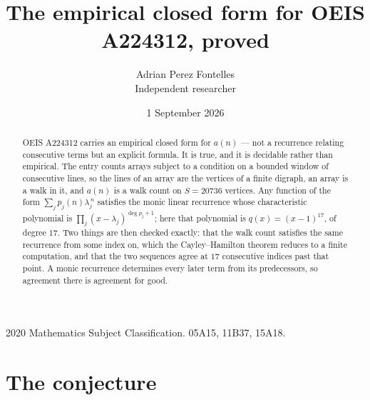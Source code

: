 \documentclass[11pt,a4paper]{article}
\title{The empirical closed form for OEIS A224312, proved}
\author{Adrian Perez Fontelles\\ \small Independent researcher}
\date{1 September 2026}
\theoremstyle{plain}
\theoremstyle{definition}
\begin{document}
\maketitle

\begin{abstract}
OEIS A224312 carries an empirical closed form for $a(n)$ --- not a recurrence relating
consecutive terms but an explicit formula. It is true, and it is decidable rather than
empirical. The entry counts arrays subject to a condition on a bounded window of consecutive lines, so the lines of an array are the
vertices of a finite digraph, an array is a walk in it, and $a(n)$ is a walk count on
$S=20736$ vertices. Any function of the form $\sum_j p_j(n)\lambda_j^{\,n}$ satisfies the
monic linear recurrence whose characteristic polynomial is
$\prod_j(x-\lambda_j)^{\deg p_j+1}$; here that polynomial is $q(x)=(x-1)^{17}$, of degree
$17$. Two things are then checked exactly: that the walk count satisfies the same
recurrence from some index on, which the Cayley--Hamilton theorem reduces to a finite
computation, and that the two sequences agree at $17$ consecutive indices past that
point. A monic recurrence determines every later term from its predecessors, so agreement
there is agreement for good.
\end{abstract}

\noindent\small 2020 Mathematics Subject Classification. 05A15, 11B37, 15A18.\normalsize

\section{The conjecture}
\end{document}
